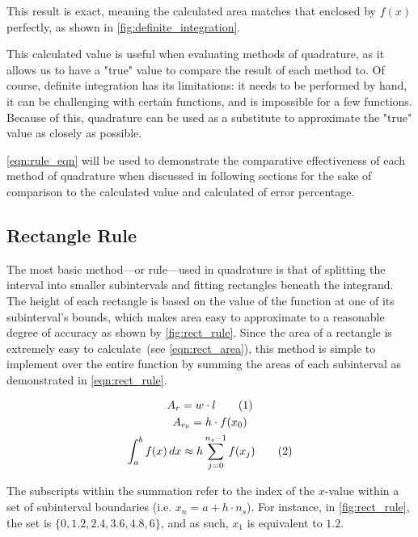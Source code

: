 \documentclass{paper}
\begin{document}
This result is exact, meaning the calculated area matches that enclosed by \(f(x)\) perfectly, as shown in \cref{fig:definite_integration}.



This calculated value is useful when evaluating methods of quadrature, as it allows us to have a "true" value to compare the result of each method to.
Of course, definite integration has its limitations: it needs to be performed by hand, it can be challenging with certain functions, and is impossible for a few functions.
Because of this, quadrature can be used as a substitute to approximate the "true" value as closely as possible.

\cref{eqn:rule_eqn} will be used to demonstrate the comparative effectiveness of each method of quadrature when discussed in following sections for the sake of comparison to the calculated value and calculated of error percentage.

\subsection{Rectangle Rule}
\label{sec:rect_rule}
The most basic method---or rule---used in quadrature is that of splitting the interval into smaller subintervals and fitting rectangles beneath the integrand.
The height of each rectangle is based on the value of the function at one of its subinterval's bounds, which makes area easy to approximate to a reasonable degree of accuracy as shown by \cref{fig:rect_rule}.
Since the area of a rectangle is extremely easy to calculate~(see \cref{eqn:rect_area}), this method is simple to implement over the entire function by summing the areas of each subinterval as demonstrated in \cref{eqn:rect_rule}.\autocite{num_methods}

\begin{gather*}
    A_{r} = w \cdot l \tageq\label{eqn:rect_area}                                               \\
    A_{r_{0}} = h \cdot f(x_0)                                                                  \\
    \int_a^b f(x) \,dx \approx h \sum^{n_s-1}_{j=0}f(x_j) \tageq\label{eqn:rect_rule}
\end{gather*}

The subscripts within the summation refer to the index of the \(x\)-value within a set of subinterval boundaries (i.e. \(x_n = a + h \cdot n_s\)).
For instance, in \cref{fig:rect_rule}, the set is \(\{0, 1.2, 2.4, 3.6, 4.8, 6\}\), and as such, \(x_1\) is equivalent to \(1.2\).
\end{document}

